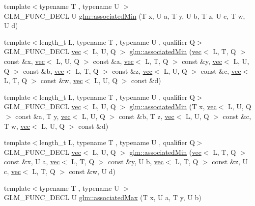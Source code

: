 \begin{DoxyCompactItemize}
\item 
{\footnotesize template$<$typename T , typename U $>$ }\\G\+L\+M\+\_\+\+F\+U\+N\+C\+\_\+\+D\+E\+CL U \hyperlink{group__gtx__associated__min__max_ga432224ebe2085eaa2b63a077ecbbbff6}{glm\+::associated\+Min} (T x, U a, T y, U b, T z, U c, T w, U d)
\item 
{\footnotesize template$<$length\+\_\+t L, typename T , typename U , qualifier Q$>$ }\\G\+L\+M\+\_\+\+F\+U\+N\+C\+\_\+\+D\+E\+CL \hyperlink{structglm_1_1vec}{vec}$<$ L, U, Q $>$ \hyperlink{group__gtx__associated__min__max_ga66b08118bc88f0494bcacb7cdb940556}{glm\+::associated\+Min} (\hyperlink{structglm_1_1vec}{vec}$<$ L, T, Q $>$ const \&x, \hyperlink{structglm_1_1vec}{vec}$<$ L, U, Q $>$ const \&a, \hyperlink{structglm_1_1vec}{vec}$<$ L, T, Q $>$ const \&y, \hyperlink{structglm_1_1vec}{vec}$<$ L, U, Q $>$ const \&b, \hyperlink{structglm_1_1vec}{vec}$<$ L, T, Q $>$ const \&z, \hyperlink{structglm_1_1vec}{vec}$<$ L, U, Q $>$ const \&c, \hyperlink{structglm_1_1vec}{vec}$<$ L, T, Q $>$ const \&w, \hyperlink{structglm_1_1vec}{vec}$<$ L, U, Q $>$ const \&d)
\item 
{\footnotesize template$<$length\+\_\+t L, typename T , typename U , qualifier Q$>$ }\\G\+L\+M\+\_\+\+F\+U\+N\+C\+\_\+\+D\+E\+CL \hyperlink{structglm_1_1vec}{vec}$<$ L, U, Q $>$ \hyperlink{group__gtx__associated__min__max_ga78c28fde1a7080fb7420bd88e68c6c68}{glm\+::associated\+Min} (T x, \hyperlink{structglm_1_1vec}{vec}$<$ L, U, Q $>$ const \&a, T y, \hyperlink{structglm_1_1vec}{vec}$<$ L, U, Q $>$ const \&b, T z, \hyperlink{structglm_1_1vec}{vec}$<$ L, U, Q $>$ const \&c, T w, \hyperlink{structglm_1_1vec}{vec}$<$ L, U, Q $>$ const \&d)
\item 
{\footnotesize template$<$length\+\_\+t L, typename T , typename U , qualifier Q$>$ }\\G\+L\+M\+\_\+\+F\+U\+N\+C\+\_\+\+D\+E\+CL \hyperlink{structglm_1_1vec}{vec}$<$ L, U, Q $>$ \hyperlink{group__gtx__associated__min__max_ga2db7e351994baee78540a562d4bb6d3b}{glm\+::associated\+Min} (\hyperlink{structglm_1_1vec}{vec}$<$ L, T, Q $>$ const \&x, U a, \hyperlink{structglm_1_1vec}{vec}$<$ L, T, Q $>$ const \&y, U b, \hyperlink{structglm_1_1vec}{vec}$<$ L, T, Q $>$ const \&z, U c, \hyperlink{structglm_1_1vec}{vec}$<$ L, T, Q $>$ const \&w, U d)
\item 
{\footnotesize template$<$typename T , typename U $>$ }\\G\+L\+M\+\_\+\+F\+U\+N\+C\+\_\+\+D\+E\+CL U \hyperlink{group__gtx__associated__min__max_ga7d9c8785230c8db60f72ec8975f1ba45}{glm\+::associated\+Max} (T x, U a, T y, U b)

\end{DoxyCompactItemize}

